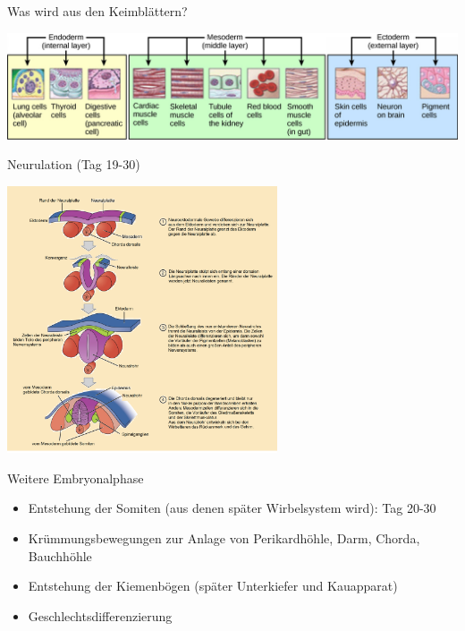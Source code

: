 \documentclass{beamer}
\begin{document}
\begin{frame}{Was wird aus den Keimblättern?}

    
\begin{center}
    \includegraphics[width=\textwidth]{Germ_layers.jpg}
\end{center}


\end{frame}


\begin{frame}{Neurulation (Tag 19-30)}



\begin{center}
    \includegraphics[width=0.6\textwidth]{Neurulation_2.png}
    \end{center}


\end{frame}


\begin{frame}{Weitere Embryonalphase}

\begin{itemize}
    \item 
    Entstehung der Somiten (aus denen später Wirbelsystem wird): Tag 20-30
    \item
    Krümmungsbewegungen zur Anlage von Perikardhöhle, Darm, Chorda, Bauchhöhle
    \item
    Entstehung der Kiemenbögen (später Unterkiefer und Kauapparat)
    \item
    Geschlechtsdifferenzierung 
\end{itemize}
\end{frame}
\end{document}
